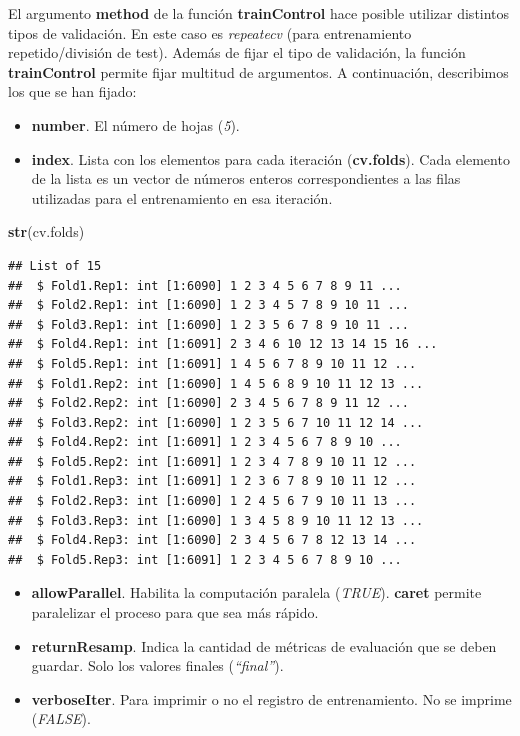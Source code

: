 \documentclass[]{article}
\newenvironment{Shaded}{\begin{snugshade}}{\end{snugshade}}
\newcommand{\KeywordTok}[1]{\textcolor[rgb]{0.13,0.29,0.53}{\textbf{#1}}}
\newcommand{\NormalTok}[1]{#1}
\providecommand{\tightlist}{%
  \setlength{\itemsep}{0pt}\setlength{\parskip}{0pt}}
\begin{document}
El argumento \textbf{method} de la función \textbf{trainControl} hace
posible utilizar distintos tipos de validación. En este caso es
\emph{repeatecv} (para entrenamiento repetido/división de test). Además
de fijar el tipo de validación, la función \textbf{trainControl} permite
fijar multitud de argumentos. A continuación, describimos los que se han
fijado:

\begin{itemize}
\tightlist
\item
  \textbf{number}. El número de hojas (\emph{5}).
\item
  \textbf{index}. Lista con los elementos para cada iteración
  (\textbf{cv.folds}). Cada elemento de la lista es un vector de números
  enteros correspondientes a las filas utilizadas para el entrenamiento
  en esa iteración.
\end{itemize}

\begin{Shaded}
\begin{Highlighting}[]
\KeywordTok{str}\NormalTok{(cv.folds)}
\end{Highlighting}
\end{Shaded}

\begin{verbatim}
## List of 15
##  $ Fold1.Rep1: int [1:6090] 1 2 3 4 5 6 7 8 9 11 ...
##  $ Fold2.Rep1: int [1:6090] 1 2 3 4 5 7 8 9 10 11 ...
##  $ Fold3.Rep1: int [1:6090] 1 2 3 5 6 7 8 9 10 11 ...
##  $ Fold4.Rep1: int [1:6091] 2 3 4 6 10 12 13 14 15 16 ...
##  $ Fold5.Rep1: int [1:6091] 1 4 5 6 7 8 9 10 11 12 ...
##  $ Fold1.Rep2: int [1:6090] 1 4 5 6 8 9 10 11 12 13 ...
##  $ Fold2.Rep2: int [1:6090] 2 3 4 5 6 7 8 9 11 12 ...
##  $ Fold3.Rep2: int [1:6090] 1 2 3 5 6 7 10 11 12 14 ...
##  $ Fold4.Rep2: int [1:6091] 1 2 3 4 5 6 7 8 9 10 ...
##  $ Fold5.Rep2: int [1:6091] 1 2 3 4 7 8 9 10 11 12 ...
##  $ Fold1.Rep3: int [1:6091] 1 2 3 6 7 8 9 10 11 12 ...
##  $ Fold2.Rep3: int [1:6090] 1 2 4 5 6 7 9 10 11 13 ...
##  $ Fold3.Rep3: int [1:6090] 1 3 4 5 8 9 10 11 12 13 ...
##  $ Fold4.Rep3: int [1:6090] 2 3 4 5 6 7 8 12 13 14 ...
##  $ Fold5.Rep3: int [1:6091] 1 2 3 4 5 6 7 8 9 10 ...
\end{verbatim}

\begin{itemize}
\tightlist
\item
  \textbf{allowParallel}. Habilita la computación paralela
  (\emph{TRUE}). \textbf{caret} permite paralelizar el proceso para que
  sea más rápido.
\item
  \textbf{returnResamp}. Indica la cantidad de métricas de evaluación
  que se deben guardar. Solo los valores finales (\emph{``final''}).
\item
  \textbf{verboseIter}. Para imprimir o no el registro de entrenamiento.
  No se imprime (\emph{FALSE}).
\end{itemize}
\end{document}
